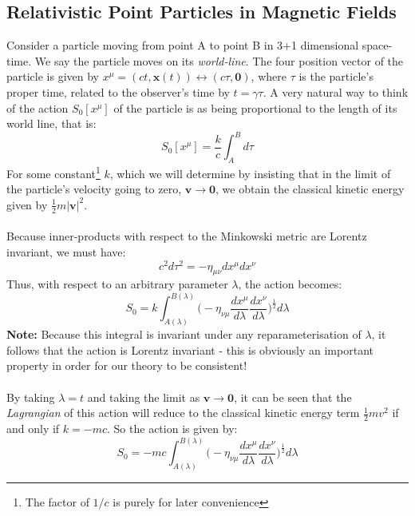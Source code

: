 \documentclass[a4paper]{article}
\numberwithin{equation}{section}
\begin{document}
\subsection{Relativistic Point Particles in Magnetic Fields}
Consider a particle moving from point A to point B in 3+1 dimensional space-time. We say the particle moves on its \textit{world-line}. The four position vector of the particle is given by $x^\mu = (ct, \mathbf{x}(t)) \leftrightarrow (c \tau, \mathbf{0})$, where $\tau$ is the particle's proper time, related to the observer's time by $t=\gamma \tau$. A very natural way to think of the action $S_0[x^\mu]$ of the particle is as being proportional to the length of its world line, that is:
\begin{equation}
S_0[x^{\mu}] = \frac{k}{c}\int_A^B d \tau
\end{equation}
For some constant\footnote{The factor of $1/c$ is purely for later convenience} $k$, which we will determine by insisting that in the limit of the particle's velocity going to zero, $\mathbf{v} \rightarrow \mathbf{0}$, we obtain the classical kinetic energy given by $\frac{1}{2}m|\mathbf{v}|^2$.\\
\\
Because inner-products with respect to the Minkowski metric are Lorentz invariant, we must have:
\begin{equation}
c^2d\tau^2=-\eta_{\mu \nu}dx^\mu dx^\nu 
\end{equation}
Thus, with respect to an arbitrary parameter $\lambda$, the action becomes:
\begin{equation}
S_0=k\int_{A(\lambda)}^{B(\lambda)}\bigg(-\eta_{\nu \mu} \frac{dx^\mu}{d \lambda}\frac{dx^\nu}{d \lambda}\bigg)^{\frac{1}{2}} d \lambda
\end{equation}
\textbf{Note:} Because this integral is invariant under any reparameterisation of $\lambda$, it follows that the action is Lorentz invariant - this is obviously an important property in order for our theory to be consistent! \\
\\
By taking $\lambda=t$ and taking the limit as $\mathbf{v} \rightarrow \mathbf{0}$, it can be seen that the \textit{Lagrangian} of this action will reduce to the classical kinetic energy term $\frac{1}{2}mv^2$ if and only if $k=-mc$. So the action is given by:
\begin{equation}
S_0=-mc\int_{A(\lambda)}^{B(\lambda)}\bigg(-\eta_{\nu \mu} \frac{dx^\mu}{d \lambda}\frac{dx^\nu}{d \lambda}\bigg)^{\frac{1}{2}} d \lambda
\end{equation}
\end{document}
